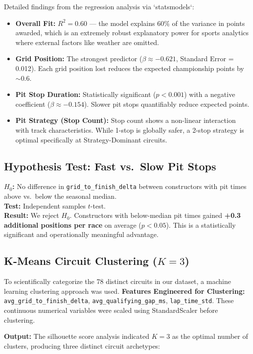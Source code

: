 \documentclass[12pt, a4paper]{article}
\begin{document}
Detailed findings from the regression analysis via `statsmodels`:
\begin{itemize}
    \item \textbf{Overall Fit:} $R^2 = 0.60$ --- the model explains 60\% of the variance in points awarded, which is an extremely robust explanatory power for sports analytics where external factors like weather are omitted.
    \item \textbf{Grid Position:} The strongest predictor ($\beta \approx -0.621$, Standard Error = 0.012). Each grid position lost reduces the expected championship points by $\sim$0.6.
    \item \textbf{Pit Stop Duration:} Statistically significant ($p < 0.001$) with a negative coefficient ($\beta \approx -0.154$). Slower pit stops quantifiably reduce expected points.
    \item \textbf{Pit Strategy (Stop Count):} Stop count shows a non-linear interaction with track characteristics. While 1-stop is globally safer, a 2-stop strategy is optimal specifically at Strategy-Dominant circuits.
\end{itemize}

\subsection{Hypothesis Test: Fast vs.\ Slow Pit Stops}
\textbf{$H_0$:} No difference in \texttt{grid\_to\_finish\_delta} between constructors with pit times above vs.\ below the seasonal median.\\
\textbf{Test:} Independent samples $t$-test.\\
\textbf{Result:} We reject $H_0$. Constructors with below-median pit times gained \textbf{+0.3 additional positions per race} on average ($p < 0.05$). This is a statistically significant and operationally meaningful advantage.

\subsection{K-Means Circuit Clustering ($K=3$)}
To scientifically categorize the 78 distinct circuits in our dataset, a machine learning clustering approach was used.
\textbf{Features Engineered for Clustering:} \texttt{avg\_grid\_to\_finish\_delta}, \texttt{avg\_qualifying\_gap\_ms}, \texttt{lap\_time\_std}. These continuous numerical variables were scaled using StandardScaler before clustering.

\textbf{Output:} The silhouette score analysis indicated $K=3$ as the optimal number of clusters, producing three distinct circuit archetypes:
\end{document}
